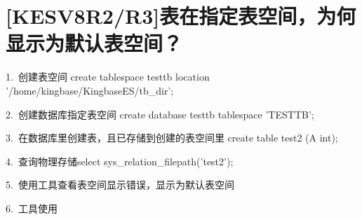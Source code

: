 \documentclass[a4,10pt,oneside,english]{sphinxmanual}
\begin{document}
\section{{[}KESV8R2/R3{]}表在指定表空间，为何显示为默认表空间？}
\label{\detokenize{system-management:kesv8r2-r3}}
1. 创建表空间 create tablespace testtb location '/home/kingbase/KingbaseES/tb\_dir';

2. 创建数据库指定表空间 create database testtb tablespace 'TESTTB';

3. 在数据库里创建表，且已存储到创建的表空间里 create table test2 (A int);

4. 查询物理存储select sys\_relation\_filepath('test2');

\begin{sphinxVerbatim}[commandchars=\\\{\}]
\end{sphinxVerbatim}

5. 使用工具查看表空间显示错误，显示为默认表空间

6. 工具使用

\begin{sphinxVerbatim}[commandchars=\\\{\}]
       

 
\end{sphinxVerbatim}
\end{document}
